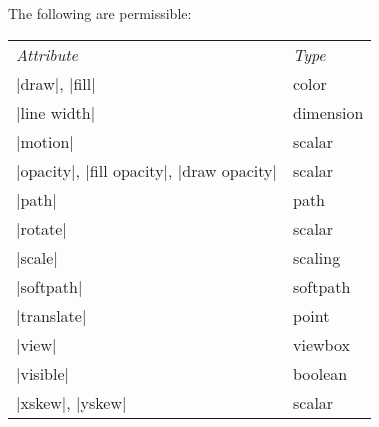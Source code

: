 \begin{command}{\pgfanimateattribute{}}
  The following  are permissible:
  
  \begin{tabular}{ll}
    \emph{Attribute} & \emph{Type} \\
    |draw|, |fill|              & color \\
    |line width|                & dimension \\
    |motion|                    & scalar \\
    |opacity|, |fill opacity|, |draw opacity|              & scalar \\
    |path|                      & path \\
    |rotate|                    & scalar \\
    |scale|                     & scaling \\
    |softpath|                  & softpath \\
    |translate|                 & point \\
    |view|                      & viewbox \\
    |visible|                   & boolean \\
    |xskew|, |yskew|            & scalar \\
  \end{tabular}


\end{command}

